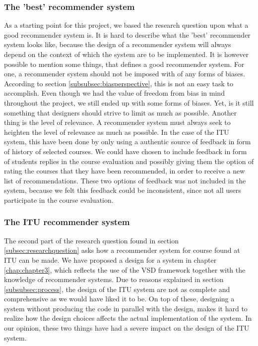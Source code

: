\subsubsection*{The 'best' recommender system}
As a starting point for this project, we based the research question upon what a good recommender system is. It is hard to describe what the 'best' recommender system looks like, because the design of a recommender system will always depend on the context of which the system are to be implemented. It is however possible to mention some things, that defines a good recommender system. \newline 
For one, a recommender system should not be imposed with of any forms of biases. According to section \ref{subsubsec:biasperspective}, this is not an easy task to accomplish.\newline 
Even though we had the value of freedom from bias in mind throughout the project, we still ended up with some forms of biases. Yet, is it still something that designers should strive to limit as much as possible.\newline
Another thing is the level of relevance. A recommender system must always seek to heighten the level of relevance as much as possible. In the case of the ITU system, this have been done by only using a authentic source of feedback in form of history of selected courses.\newline
We could have chosen to include feedback in form of students replies in the course evaluation and possibly giving them the option of rating the courses that they have been recommended, in order to receive a new list of recommendations. These two options of feedback was not included in the system, because we felt this feedback could be inconsistent, since not all users participate in the course evaluation.


\subsubsection{The ITU recommender system}
The second part of the research question found in section \ref{subsec:researchquestion} asks how a recommender system for course found at ITU can be made. We have proposed a design for a system in chapter \ref{chap:chapter3}, which reflects the use of the VSD framework together with the knowledge of recommender systems. \newline
Due to reasons explained in section \ref{subsubsec:process}, the design of the ITU system are not as complete and comprehensive as we would have liked it to be.\newline 
On top of these, designing a system without producing the code in parallel with the design, makes it hard to realize how the design choices affects the actual implementation of the system. In our opinion, these two things have had a severe impact on the design of the ITU system. \newline 

